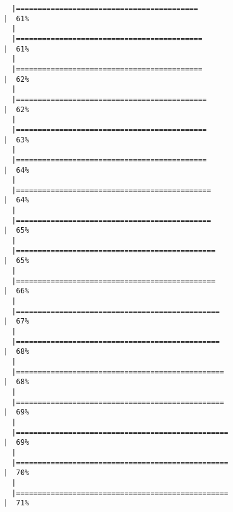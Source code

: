 \documentclass[
  letterpaper,
]{book}
\begin{document}
\begin{verbatim}
  |==========================================                            |  61%
  |                                                                            
  |===========================================                           |  61%
  |                                                                            
  |===========================================                           |  62%
  |                                                                            
  |============================================                          |  62%
  |                                                                            
  |============================================                          |  63%
  |                                                                            
  |============================================                          |  64%
  |                                                                            
  |=============================================                         |  64%
  |                                                                            
  |=============================================                         |  65%
  |                                                                            
  |==============================================                        |  65%
  |                                                                            
  |==============================================                        |  66%
  |                                                                            
  |===============================================                       |  67%
  |                                                                            
  |===============================================                       |  68%
  |                                                                            
  |================================================                      |  68%
  |                                                                            
  |================================================                      |  69%
  |                                                                            
  |=================================================                     |  69%
  |                                                                            
  |=================================================                     |  70%
  |                                                                            
  |=================================================                     |  71%

\end{verbatim}
\end{document}
